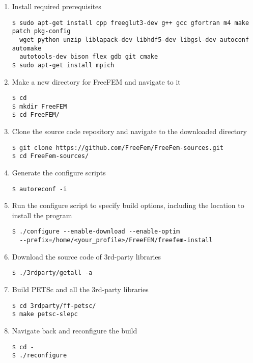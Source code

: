 \begin{enumerate}
\item Install required prerequisites
\begin{verbatim}
$ sudo apt-get install cpp freeglut3-dev g++ gcc gfortran m4 make patch pkg-config
  wget python unzip liblapack-dev libhdf5-dev libgsl-dev autoconf automake 
  autotools-dev bison flex gdb git cmake
$ sudo apt-get install mpich
\end{verbatim}

\item Make a new directory for FreeFEM and navigate to it
\begin{verbatim}
$ cd
$ mkdir FreeFEM
$ cd FreeFEM/
\end{verbatim}

\item Clone the source code repository and navigate to the downloaded directory
\begin{verbatim}
$ git clone https://github.com/FreeFem/FreeFem-sources.git
$ cd FreeFem-sources/
\end{verbatim}

\item Generate the configure scripts
\begin{verbatim}
$ autoreconf -i
\end{verbatim}

\item Run the configure script to specify build options, including the location to install the program
\begin{verbatim}
$ ./configure --enable-download --enable-optim 
  --prefix=/home/<your_profile>/FreeFEM/freefem-install
\end{verbatim}

\item Download the source code of 3rd-party libraries
\begin{verbatim}
$ ./3rdparty/getall -a
\end{verbatim}

\item Build PETSc and all the 3rd-party libraries
\begin{verbatim}
$ cd 3rdparty/ff-petsc/
$ make petsc-slepc
\end{verbatim}

\item Navigate back and reconfigure the build
\begin{verbatim}
$ cd -
$ ./reconfigure
\end{verbatim}


\end{enumerate}
